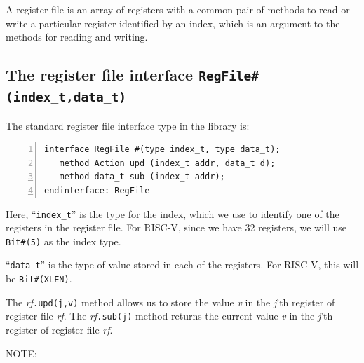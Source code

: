 \label{Sec_Register_files}


A register file is an array of registers with a common pair of methods
to read or write a particular register identified by an index, which
is an argument to the methods for reading and writing.


\subsection{The register file interface {\tt RegFile\#(index\_t,data\_t)}}

\label{Sec_RegFile_interface}



The standard register file interface type in the {\BSV} library is:

{\footnotesize
\begin{Verbatim}[frame=single, numbers=left]
interface RegFile #(type index_t, type data_t);
   method Action upd (index_t addr, data_t d);
   method data_t sub (index_t addr);
endinterface: RegFile
\end{Verbatim}
}

Here, ``\verb|index_t|'' is the type for the index, which we use to
identify one of the registers in the register file.  For RISC-V, since
we have 32 registers, we will use \verb|Bit#(5)| as the index type.

``\verb|data_t|'' is the type of value stored in each of the
registers.  For RISC-V, this will be \verb|Bit#(XLEN)|.

The \emph{rf}{\tt.upd(j,v)} method allows us to store the value
\emph{v} in the \emph{j}'th register of register file \emph{rf}.  The
\emph{rf}{\tt.sub(j)} method returns the current value \emph{v} in the
\emph{j}'th register of register file \emph{rf}.

\vspace{2ex}

NOTE: 

